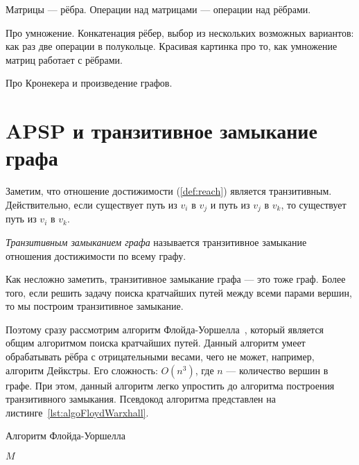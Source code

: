  Матрицы --- рёбра. Операции над матрицами --- операции над рёбрами. 

Про умножение. Конкатенация рёбер, выбор из нескольких возможных вариантов: как раз две операции в полукольце. Красивая картинка про то, как умножение матриц работает с рёбрами. 

Про Кронекера и произведение графов.




\section{APSP и транзитивное замыкание графа}

Заметим, что отношение достижимости (\ref{def:reach}) является транзитивным.
Действительно, если существует путь из $v_i$ в $v_j$ и путь из $v_j$ в $v_k$, то существует путь из $v_i$ в $v_k$.

\begin{definition}
  \textit{Транзитивным замыканием графа} называется транзитивное замыкание отношения достижимости по всему графу.
\end{definition}

Как несложно заметить, транзитивное замыкание графа --- это тоже граф.
Более того, если решить задачу поиска кратчайших путей между всеми парами вершин, то мы построим транзитивное замыкание.

Поэтому сразу рассмотрим алгоритм Флойда-Уоршелла~\cite{Floyd1962, Bernard1959, Warshall1962}, который является общим алгоритмом поиска кратчайших путей. Данный алгоритм умеет обрабатывать рёбра с отрицательными весами, чего не может, например, алгоритм Дейкстры. Его сложность: $O(n^3)$, где $n$ --- количество вершин в графе. При этом, данный алгоритм легко упростить до алгоритма построения транзитивного замыкания. Псевдокод алгоритма представлен на листинге~\ref{lst:algoFloydWarxhall}.

\begin{algorithm}
\begin{algorithmic}[1]
\caption{Алгоритм Флойда-Уоршелла}
\label{lst:algoFloydWarxhall}
        \EndFor
      \EndFor
    \EndFor
\State \Return $M$
\EndFunction
\end{algorithmic}
\end{algorithm}

